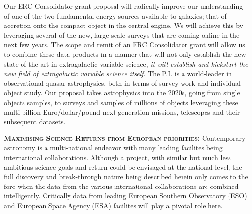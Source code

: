 \smallskip
\smallskip
\noindent
Our ERC Consolidator grant proposal will radically improve our
understanding of one of the two fundamental energy sources available
to galaxies; that of accretion onto the compact object in the central
engine. We will achieve this by leveraging several of the new,
large-scale surveys that are coming online in the next few years.  The
scope and remit of an ERC Consolidator grant will allow us to combine
these data products in a manner that will not only establish the new
state-of-the-art in extragalactic variable science, {\it it will
establish and kickstart the new field of extragalactic variable
science itself}.  The P.I. is a world-leader in observational quasar
astrophysics, both in terms of survey work and individual object
study.  Our proposal takes astrophysics into the 2020s, going from
single objects samples, to surveys and samples of millions of objects
leveraging these multi-billion Euro/dollar/pound next generation
missions, telescopes and their subsequent datasets.


\smallskip
\smallskip
\noindent
\textbf{\textsc{Maximising Science Returns from European priorities:}}
Contemporary astronomy is a multi-national endeavor with many leading
facilites being international collaborations. Although a project, with
similar but much less ambitious science goals and return could be
envisaged at the national level, the full discovery and break-through
nature being described herein only comes to the fore when the data
from the various international collaborations are combined
intelligently.  Critically data from leading European Southern
Observatory (ESO) and European Space Agency (ESA) facilites will play
a pivotal role here.



\smallskip

